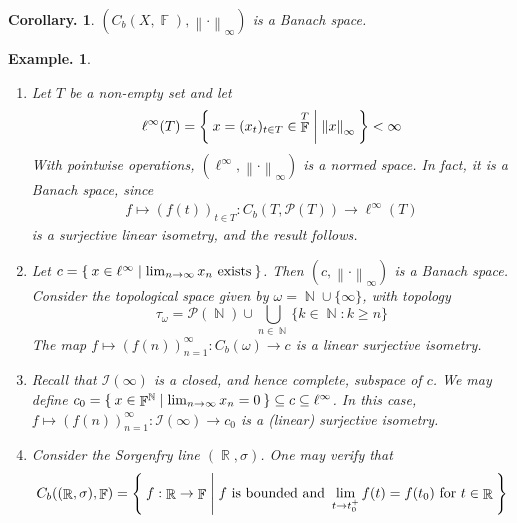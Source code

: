 \documentclass[11pt, a4paper]{memoir}
\DeclareMathOperator{\N}{{\mathbb{N}}}
\DeclareMathOperator{\R}{{\mathbb{R}}}
\DeclareMathOperator{\F}{{\mathbb{F}}}
\newcommand{\norm}[1]{\ensuremath{\left\lVert#1\right\rVert}}
\theoremstyle{change}
\newtheorem{corollary}[theorem]{Corollary.}
\theoremstyle{plain}
\theoremstyle{nonumberplain}
\newtheorem{example}{Example.}
\newcommand{\lp}[1]{\ensuremath{\ell^{#1}}}
\numberwithin{equation}{section}
\begin{document}
\begin{corollary}
    $(C_b(X,\F),\norm{\cdot}_\infty)$ is a Banach space.
\end{corollary}
\begin{example}
    \begin{enumerate}[nl,r]
        \item Let $T$ be a non-empty set and let
            \begin{equation*}
                \lp{\infty}(T) = \Set{x=(x_t)_{t\in T}\in\F^T | \norm{x}_\infty}<\infty
            \end{equation*}
            With pointwise operations, $(\lp{\infty},\norm{\cdot}_\infty)$ is a normed space.
            In fact, it is a Banach space, since
            \begin{align*}
                f\mapsto (f(t))_{t\in T}:C_b(T,\mathcal{P}(T))\to\lp{\infty}(T)
            \end{align*}
            is a surjective linear isometry, and the result follows.
        \item Let $c=\Set{x\in\lp{\infty} | \lim_{n\to\infty}x_n\text{ exists}}$.
            Then $(c,\norm{\cdot}_\infty)$ is a Banach space.
            Consider the topological space given by $\omega=\N\cup\{\infty\}$, with topology
            \begin{equation*}
                \tau_\omega=\mathcal{P}(\N)\cup\bigcup_{n\in\N}\{k\in\N:k\geq n\}
            \end{equation*}
            The map $f\mapsto(f(n))_{n=1}^\infty:C_b(\omega)\to c$ is a linear surjective isometry.
        \item Recall that $\mathcal{I}(\infty)$ is a closed, and hence complete, subspace of $c$.
            We may define $c_0=\Set{x\in\F^{\N} | \lim_{n\to\infty}x_n=0}\subseteq c\subseteq\lp{\infty}$.
            In this case, $f\mapsto(f(n))_{n=1}^\infty:\mathcal{I}(\infty)\to c_0$ is a (linear) surjective isometry.
        \item Consider the Sorgenfry line $(\R,\sigma)$.
            One may verify that
            \begin{equation*}
                C_b((\R,\sigma),\F)=\Set{f:\R\to\F | f\text{ is bounded and }\lim_{t\to t_0^+} f(t)=f(t_0)\text{ for }t\in\R}
            \end{equation*}
    \end{enumerate}
\end{example}
\end{document}
